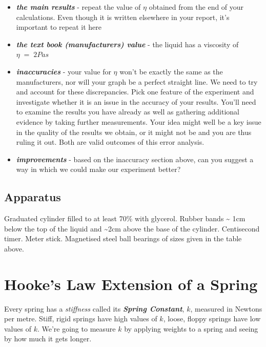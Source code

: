 \documentclass[
  letterpaper,
  DIV=11,
  numbers=noendperiod]{scrreprt}
\begin{document}
\begin{itemize}
\item
  \textbf{\emph{the main results}} - repeat the value of \(\eta\)
  obtained from the end of your calculations. Even though it is written
  elsewhere in your report, it's important to repeat it here
\item
  \textbf{\emph{the text book (manufacturers) value}} - the liquid has a
  viscosity of \(\eta \; = \; 2Pas\)
\item
  \textbf{\emph{inaccuracies}} - your value for \(\eta\) won't be
  exactly the same as the manufacturers, nor will your graph be a
  perfect straight line. We need to try and account for these
  discrepancies. Pick one feature of the experiment and investigate
  whether it is an issue in the accuracy of your results. You'll need to
  examine the results you have already as well as gathering additional
  evidence by taking further measurements. Your idea might well be a key
  issue in the quality of the results we obtain, or it might not be and
  you are thus ruling it out. Both are valid outcomes of this error
  analysis.
\item
  \textbf{\emph{improvements}} - based on the inaccuracy section above,
  can you suggest a way in which we could make our experiment better?
\end{itemize}

\section{Apparatus}\label{apparatus-2}

Graduated cylinder filled to at least 70\% with glycerol. Rubber bands
\textasciitilde{} 1cm below the top of the liquid and \textasciitilde2cm
above the base of the cylinder. Centisecond timer. Meter stick.
Magnetised steel ball bearings of sizes given in the table above.


\chapter{Hooke's Law Extension of a
Spring}\label{hookes-law-extension-of-a-spring}

Every spring has a \emph{stiffness} called its \textbf{\emph{Spring
Constant}}, \(k\), measured in Newtons per metre. Stiff, rigid springs
have high values of \(k\), loose, floppy springs have low values of
\(k\). We're going to measure \(k\) by applying weights to a spring and
seeing by how much it gets longer.
\end{document}

